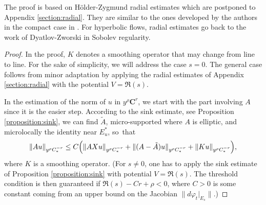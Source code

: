 \documentclass[10pt]{amsart}
\newcommand{\bC}{\boldsymbol{C}}
\theoremstyle{plain}
\theoremstyle{definition}
\begin{document}
The proof is based on Hölder-Zygmund radial estimates which are postponed to Appendix \ref{section:radial}. They are similar to the ones developed by the authors in the compact case in \cite{Bonthonneau-Lefeuvre-21}. For hyperbolic flows, radial estimates go back to the work of Dyatlov-Zworski \cite{Dyatlov-Zworski-16} in Sobolev regularity.

\begin{proof}
In the proof, $K$ denotes a smoothing operator that may change from line to line. For the sake of simplicity, we will address the case $s=0$. The general case follows from minor adaptation by applying the radial estimates of Appendix \ref{section:radial} with the potential $V=\Re(s)$.

In the estimation of the norm of $u$ in $y^\rho \bC^r$, we start with the part involving $A$ since it is the easier step. According to the sink estimate, see Proposition \ref{proposition:sink}, we can find $\tilde{A}$, micro-supported where $A$ is elliptic, and microlocally the identity near $E^\ast_u$, so~that
\[
\| A u \|_{y^\rho C^{-r}_*} \leq C \Bigl(\| A Xu \|_{y^\rho C^{-r}_*} + \|(A-\tilde{A})u\|_{y^\rho C^{-r}_*} + \| K u \|_{y^\rho C^{-r}_*}\Bigr),
\]
where $K$ is a smoothing operator. (For $s \neq 0$, one has to apply the sink estimate of Proposition \ref{proposition:sink} with potential $V = \Re(s)$. The threshold condition is then guaranteed if $\Re(s) - Cr + \rho < 0$, where $C > 0$ is some constant coming from an upper bound on the Jacobian $\|d\varphi_{t}|_{E_s}\|$.)


\end{proof}
\end{document}
